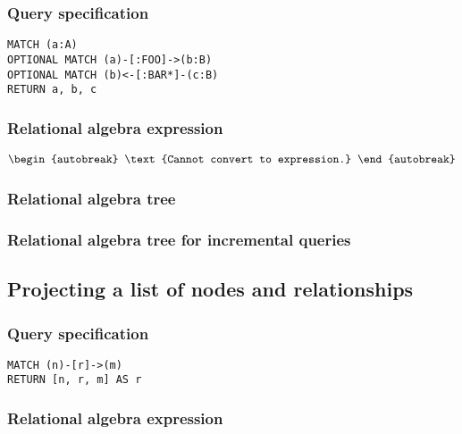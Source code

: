 \subsubsection*{Query specification}

\begin{lstlisting}
MATCH (a:A)
OPTIONAL MATCH (a)-[:FOO]->(b:B)
OPTIONAL MATCH (b)<-[:BAR*]-(c:B)
RETURN a, b, c
\end{lstlisting}

\subsubsection*{Relational algebra expression}

\begin{align*}
\begin{autobreak}
\text{Cannot convert to expression.}
\end{autobreak}
\end{align*}

\subsubsection*{Relational algebra tree}


\subsubsection*{Relational algebra tree for incremental queries}


\subsection{Projecting a list of nodes and relationships}

\subsubsection*{Query specification}

\begin{lstlisting}
MATCH (n)-[r]->(m)
RETURN [n, r, m] AS r
\end{lstlisting}

\subsubsection*{Relational algebra expression}

